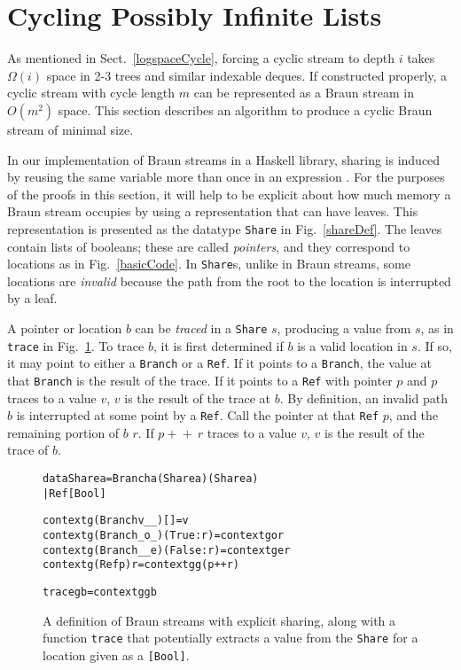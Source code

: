 \documentclass[envcountsect]{llncs}
\newcommand{\app}{+\!\!\!+\ }
\newcommand{\share}{{\tt Share} }
\begin{document}
\section{Cycling Possibly Infinite Lists}
\label{cycleSect}

As mentioned in Sect.~\ref{logspaceCycle}, forcing a cyclic stream to depth $i$ takes $\Omega(i)$ space in 2-3 trees and similar indexable deques.
If constructed properly, a cyclic stream with cycle length $m$ can be represented as a Braun stream in $O(m^2)$ space.
This section describes an algorithm to produce a cyclic Braun stream of minimal size.

In our implementation of Braun streams in a Haskell library, sharing is induced by reusing the same variable more than once in an expression \cite{website}.
For the purposes of the proofs in this section, it will help to be explicit about how much memory a Braun stream occupies by using a representation that can have leaves.
This representation is presented as the datatype {\tt Share} in Fig.~\ref{shareDef}.
The leaves contain lists of booleans; these are called {\em pointers}, and they correspond to locations as in Fig.~\ref{basicCode}.
In {\tt Share}s, unlike in Braun streams, some locations are {\em invalid} because the path from the root to the location is interrupted by a leaf.

A pointer or location $b$ can be {\em traced} in a \share $s$, producing a value from $s$, as in {\tt trace} in Fig.~\ref{traceDef}.
To trace $b$, it is first determined if $b$ is a valid location in $s$.
If so, it may point to either a {\tt Branch} or a {\tt Ref}.
If it points to a {\tt Branch}, the value at that {\tt Branch} is the result of the trace.
If it points to a {\tt Ref} with pointer $p$ and $p$ traces to a value $v$, $v$ is the result of the trace at $b$.
By definition, an invalid path $b$ is interrupted at some point by a {\tt Ref}.
Call the pointer at that {\tt Ref} $p$, and the remaining portion of $b$ $r$.
If $p \app r$ traces to a value $v$, $v$ is the result of the trace of $b$.

\begin{figure}
\begin{alltt}
data Share a = Branch a (Share a) (Share a)
             | Ref [Bool]


context g (Branch v _ _) [] = v
context g (Branch _ o _) (True:r) = context g o r
context g (Branch _ _ e) (False:r) = context g e r
context g (Ref p) r = context g g (p++r)

trace g b = context g g b
\end{alltt}
\caption{A definition of Braun streams with explicit sharing, along with a function {\tt trace} that potentially extracts a value from the {\tt Share} for a location given as a {\tt [Bool]}.}
\label{shareDef}
\label{traceDef}
\end{figure}
\end{document}
